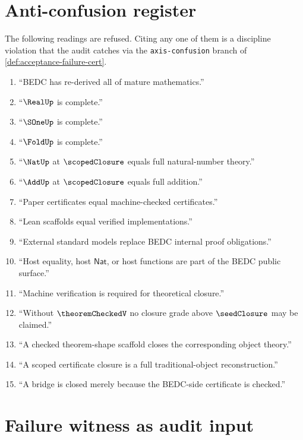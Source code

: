 \section{Anti-confusion register}
\label{sec:anti-confusion-register}

\begin{remark}
\label{rem:anti-confusion-list}
The following readings are refused. Citing any one of them is a discipline violation that the audit catches via the \texttt{axis-confusion} branch of \autoref{def:acceptance-failure-cert}.
\begin{enumerate}
  \item ``BEDC has re-derived all of mature mathematics.''
  \item ``$\RealUp$ is complete.''
  \item ``$\SOneUp$ is complete.''
  \item ``$\FoldUp$ is complete.''
  \item ``$\NatUp$ at $\scopedClosure$ equals full natural-number theory.''
  \item ``$\AddUp$ at $\scopedClosure$ equals full addition.''
  \item ``Paper certificates equal machine-checked certificates.''
  \item ``Lean scaffolds equal verified implementations.''
  \item ``External standard models replace BEDC internal proof obligations.''
  \item ``Host equality, host $\mathsf{Nat}$, or host functions are part of the BEDC public surface.''
  \item ``Machine verification is required for theoretical closure.''
  \item ``Without $\theoremCheckedV$ no closure grade above $\seedClosure$ may be claimed.''
  \item ``A checked theorem-shape scaffold closes the corresponding object theory.''
  \item ``A scoped certificate closure is a full traditional-object reconstruction.''
  \item ``A bridge is closed merely because the BEDC-side certificate is checked.''
\end{enumerate}
\end{remark}

\section{Failure witness as audit input}
\label{sec:acceptance-cannot-claim-audit}

